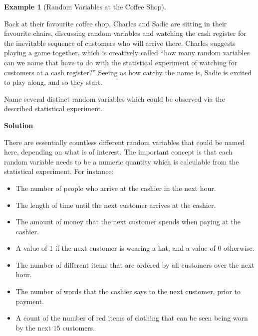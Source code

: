 \documentclass[
  letterpaper,
  DIV=11,
  numbers=noendperiod]{scrreprt}
\providecommand{\tightlist}{%
  \setlength{\itemsep}{0pt}\setlength{\parskip}{0pt}}\usepackage{longtable,booktabs,array}
\theoremstyle{definition}
\theoremstyle{definition}
\newtheorem{example}{Example}[chapter]
\theoremstyle{definition}
\theoremstyle{remark}
\begin{document}
\begin{example}[Random Variables at the Coffee
Shop]\protect\hypertarget{exm-random-var}{}\label{exm-random-var}

Back at their favourite coffee shop, Charles and Sadie are sitting in
their favourite chairs, discussing random variables and watching the
cash register for the inevitable sequence of customers who will arrive
there. Charles suggests playing a game together, which is creatively
called ``how many random variables can we name that have to do with the
statistical experiment of watching for customers at a cash register?''
Seeing as how catchy the name is, Sadie is excited to play along, and so
they start.

Name several distinct random variables which could be observed via the
described statistical experiment.

\begin{tcolorbox}[enhanced jigsaw, colback=white, colframe=quarto-callout-color-frame, arc=.35mm, leftrule=.75mm, rightrule=.15mm, opacityback=0, breakable, bottomrule=.15mm, left=2mm, toprule=.15mm]

\vspace{-3mm}\textbf{Solution}\vspace{3mm}

There are essentially countless different random variables that could be
named here, depending on what is of interest. The important concept is
that each random variable needs to be a numeric quantity which is
calculable from the statistical experiment. For instance:

\begin{itemize}
\tightlist
\item
  The number of people who arrive at the cashier in the next hour.
\item
  The length of time until the next customer arrives at the cashier.
\item
  The amount of money that the next customer spends when paying at the
  cashier.
\item
  A value of \(1\) if the next customer is wearing a hat, and a value of
  \(0\) otherwise.
\item
  The number of different items that are ordered by all customers over
  the next hour.
\item
  The number of words that the cashier says to the next customer, prior
  to payment.
\item
  A count of the number of red items of clothing that can be seen being
  worn by the next \(15\) customers.
\end{itemize}

\end{tcolorbox}

\end{example}
\end{document}
